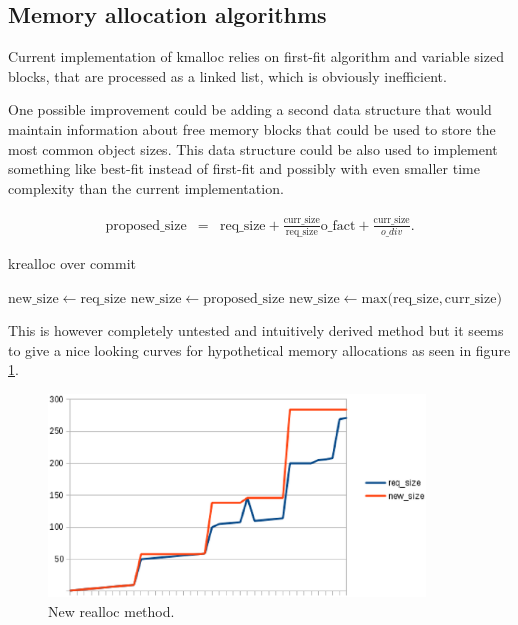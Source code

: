 \subsection{Memory allocation algorithms}

Current implementation of kmalloc relies on first-fit algorithm and variable
sized blocks, that are processed as a linked list, which is obviously inefficient.

One possible improvement could be adding a second data structure that would
maintain information about free memory blocks that could be used to store the
most common object sizes. This data structure could be also used to implement
something like best-fit instead of first-fit and possibly with even smaller
time complexity than the current implementation.

\begin{eqnarray}
\mathrm{proposed\_size} &=& \mathrm{req\_size}
  + \frac{\mathrm{curr\_size}}{\mathrm{req\_size}} \mathrm{o\_fact}
  + \frac{\mathrm{curr\_size}}{o\_div}.
\end{eqnarray}

\begin{algorithm}
  \caption{krealloc over commit}
  \label{algo:realloc_oc}
  \begin{algorithmic}
        \State $\mathrm{new\_size} \gets \mathrm{req\_size}$
      \Else
          \State $\mathrm{new\_size} \gets \mathrm{proposed\_size}$
        \Else
          \State $\mathrm{new\_size} \gets \mathrm{max(req\_size, curr\_size})$
        \EndIf
      \EndIf
  \end{algorithmic}
\end{algorithm}

This is however completely untested and intuitively derived method but it
seems to give a nice looking curves for hypothetical memory allocations as seen
in figure \ref{figure:realloc}.

\begin{figure}
  \center
  \includegraphics[width=10cm]{pics/realloc}
  \caption{New realloc method.}
  \label{figure:realloc}
\end{figure}
